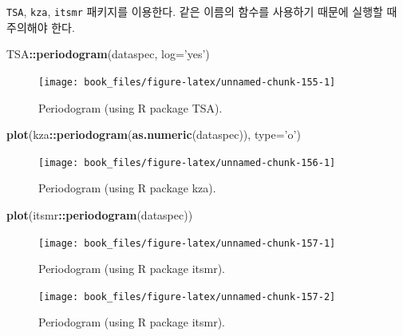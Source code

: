 \documentclass[b5paper,]{scrbook}
\makeatletter
\newenvironment{Shaded}{\begin{snugshade}}{\end{snugshade}}
\newcommand{\KeywordTok}[1]{\textcolor[rgb]{0.13,0.29,0.53}{\textbf{#1}}}
\newcommand{\DataTypeTok}[1]{\textcolor[rgb]{0.13,0.29,0.53}{#1}}
\newcommand{\StringTok}[1]{\textcolor[rgb]{0.31,0.60,0.02}{#1}}
\newcommand{\OperatorTok}[1]{\textcolor[rgb]{0.81,0.36,0.00}{\textbf{#1}}}
\newcommand{\NormalTok}[1]{#1}
\theoremstyle{plain}
\theoremstyle{definition}
\numberwithin{equation}{section}
\newenvironment{kframe}{%
\medskip{}
\setlength{\fboxsep}{.8em}
 \def\at@end@of@kframe{}%
 \ifinner\ifhmode%
  \def\at@end@of@kframe{\end{minipage}}%
  \begin{minipage}{\columnwidth}%
 \fi\fi%
 \def\FrameCommand##1{\hskip\@totalleftmargin \hskip-\fboxsep
 \colorbox{shadecolor}{##1}\hskip-\fboxsep
     \hskip-\linewidth \hskip-\@totalleftmargin \hskip\columnwidth}%
 \MakeFramed {\advance\hsize-\width
   \@totalleftmargin\z@ \linewidth\hsize
   \@setminipage}}%
 {\par\unskip\endMakeFramed%
 \at@end@of@kframe}
\renewenvironment{Shaded}{\begin{kframe}}{\end{kframe}}
\makeatother
\begin{document}
\texttt{TSA}, \texttt{kza}, \texttt{itsmr} 패키지를 이용한다. 같은
이름의 함수를 사용하기 때문에 실행할 때 주의해야 한다.

\begin{Shaded}
\begin{Highlighting}[]
\NormalTok{TSA}\OperatorTok{::}\KeywordTok{periodogram}\NormalTok{(dataspec, }\DataTypeTok{log=}\StringTok{'yes'}\NormalTok{)}
\end{Highlighting}
\end{Shaded}

\begin{figure}

{\centering \texttt{[image: book\_files/figure-latex/unnamed-chunk-155-1]} 

}

\caption{Periodogram (using R package TSA).}\label{fig:unnamed-chunk-155}
\end{figure}

\begin{Shaded}
\begin{Highlighting}[]
\KeywordTok{plot}\NormalTok{(kza}\OperatorTok{::}\KeywordTok{periodogram}\NormalTok{(}\KeywordTok{as.numeric}\NormalTok{(dataspec)), }\DataTypeTok{type=}\StringTok{'o'}\NormalTok{)}
\end{Highlighting}
\end{Shaded}

\begin{figure}

{\centering \texttt{[image: book\_files/figure-latex/unnamed-chunk-156-1]} 

}

\caption{Periodogram (using R package kza).}\label{fig:unnamed-chunk-156}
\end{figure}

\begin{Shaded}
\begin{Highlighting}[]
\KeywordTok{plot}\NormalTok{(itsmr}\OperatorTok{::}\KeywordTok{periodogram}\NormalTok{(dataspec))}
\end{Highlighting}
\end{Shaded}

\begin{figure}

{\centering \texttt{[image: book\_files/figure-latex/unnamed-chunk-157-1]} 

}

\caption{Periodogram (using R package itsmr).}\label{fig:unnamed-chunk-1571}
\end{figure}\begin{figure}

{\centering \texttt{[image: book\_files/figure-latex/unnamed-chunk-157-2]} 

}

\caption{Periodogram (using R package itsmr).}\label{fig:unnamed-chunk-1572}
\end{figure}
\end{document}
